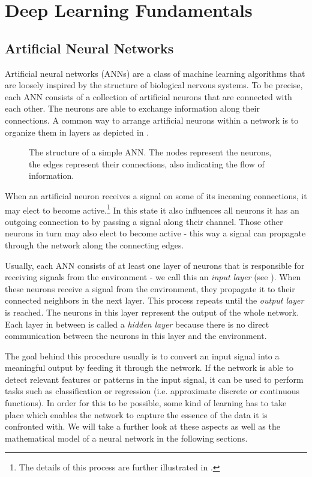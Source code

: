 \chapter{Deep Learning Fundamentals}

\section{Artificial Neural Networks}

Artificial neural networks (ANNs) are a class of machine learning algorithms
that are loosely inspired by the structure of biological nervous
systems.
To be precise, each ANN consists of a collection of artificial neurons
that are connected with each other. The neurons are able to exchange
information along their connections.
A common way to arrange artificial neurons within a network is to organize
them in layers as depicted in .
\begin{figure}[h]
  \centering
  \resizebox{0.75\textwidth}{!}{}
  \caption{The structure of a simple ANN. The nodes represent the
    neurons, the edges represent their connections, also indicating
    the flow of information.}
  \label{fig:basic-network}
\end{figure}

When an artificial neuron receives a signal on some of its
incoming connections, it may elect to become active.\footnote{The
  details of this
  process are further illustrated in .}
In this state it also influences all neurons it has an outgoing
connection to by passing a signal along their
channel. Those other neurons in turn may also elect to become
active - this way a signal can propagate through the network along
the connecting edges.

Usually, each ANN consists of at least one layer of neurons that is
responsible for receiving signals from the environment - we call this
an \textit{input layer} (see ). When these neurons
receive a signal from the environment, they propagate it to their
connected neighbors in the next layer. This process repeats until the
\textit{output layer} is reached. The neurons in this layer represent the
output of the whole network. Each layer in between is called a \textit{hidden
layer} because there is no direct communication between the neurons in
this layer and the environment.

The goal behind this procedure usually is to convert an input signal
into a meaningful output by feeding it through the network. If the
network is able to detect relevant features or patterns in the input
signal, it can be used to perform tasks such as classification or
regression (i.e. approximate discrete or continuous functions).
In order for this to be possible, some kind of learning has to take
place which enables the network to capture the essence of the data it
is confronted with. We will take a further look at these aspects as
well as the mathematical model of a neural network in the following
sections.


